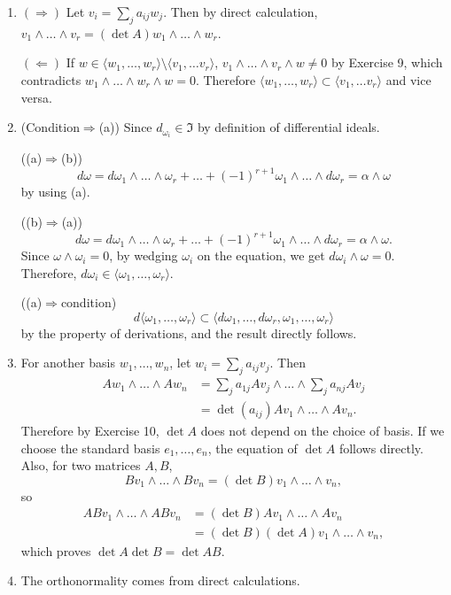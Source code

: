 \begin{enumerate}
$(\Rightarrow)$ Suppose $v_{1}, \ldots, v_{p}$ are linearly independent, 
then there is a linear map $\varphi\colon V \rightarrow k^{r}, v_{i} \mapsto e_{i}$. 
By the universal property, it induces a map $\Lambda_{r}(\varphi)\colon \Lambda_{r}(V) \rightarrow \Lambda_{r}(k^{r})$. 
Since $\varphi(v_{1} \wedge \ldots \wedge v_{p})=e_{1} \wedge \ldots \wedge e_{p} \neq 0$ by 2.6, $v_{1} \wedge \ldots \wedge v_{p} \neq 0$.
\item $(\Rightarrow)$ Let $v_{i}=\sum_{j} a_{ij} w_{j}$. 
Then by direct calculation, $v_{1} \wedge \ldots \wedge v_{r}=(\det A) w_{1} \wedge \ldots \wedge w_{r}$.

$(\Leftarrow)$ If $w \in \langle w_{1}, \ldots, w_{r}\rangle\setminus\langle v_{1}, \ldots v_{r}\rangle$, 
$v_{1} \wedge \ldots \wedge v_{r} \wedge w \neq 0$ by Exercise 9, 
which contradicts $w_{1} \wedge \ldots \wedge w_{r} \wedge w=0$. 
Therefore $\langle w_{1}, \ldots, w_{r}\rangle\subset\langle v_{1}, \ldots v_{r}\rangle$ and vice versa.
\item (Condition$\Rightarrow$(a)) Since $d_{\omega_{i}} \in \mathfrak{I}$ by definition of differential ideals.

((a)$\Rightarrow$(b))
\[d \omega=d \omega_{1} \wedge \ldots \wedge \omega_{r}+\ldots+(-1)^{r+1} \omega_{1} \wedge \ldots \wedge d \omega_{r}=\alpha \wedge \omega\]
by using (a).

((b)$\Rightarrow$(a))
\[d \omega=d \omega_{1} \wedge \ldots \wedge \omega_{r}+\ldots+(-1)^{r+1} \omega_{1} \wedge \ldots \wedge d \omega_{r}=\alpha \wedge \omega.\]
Since $\omega \wedge \omega_{i}=0$, by wedging $\omega_{i}$ on the equation, we get $d \omega_{i} \wedge \omega=0$. 
Therefore, $d \omega_{i} \in \langle\omega_{1}, \ldots, \omega_{r}\rangle$.

((a)$\Rightarrow$condition)
\[d\langle \omega_{1}, \ldots, \omega_{r}\rangle\subset\langle d \omega_{1}, \ldots, d \omega_{r}, \omega_{1}, \ldots, \omega_{r}\rangle\]
by the property of derivations, and the result directly follows.
\item For another basis $w_{1}, \ldots, w_{n}$, let $w_{i}=\sum_{j} a_{ij} v_{j}$. Then
\begin{align*}A w_{1} \wedge \ldots \wedge A w_{n}
&=\sum_{j} a_{1j} A v_{j} \wedge \ldots \wedge \sum_{j} a_{nj} A v_{j}\\
&=\det(a_{ij}) A v_{1} \wedge \ldots \wedge A v_{n}.\end{align*}
Therefore by Exercise 10, $\det A$ does not depend on the choice of basis. 
If we choose the standard basis $e_{1}, \ldots, e_{n}$, the equation of $\det A$ follows directly. 
Also, for two matrices $A, B$,
\[B v_{1} \wedge \ldots \wedge B v_{n}
=(\det B) v_{1} \wedge \ldots \wedge v_{n},\]
so
\begin{align*}
A B v_{1} \wedge \ldots \wedge A B v_{n}
&=(\det B) A v_{1} \wedge \ldots \wedge A v_{n}\\
&=(\det B)(\det A) v_{1} \wedge \ldots \wedge v_{n},
\end{align*}
which proves $\det A \det B=\det AB$.
\item The orthonormality comes from direct calculations.


\end{enumerate}
